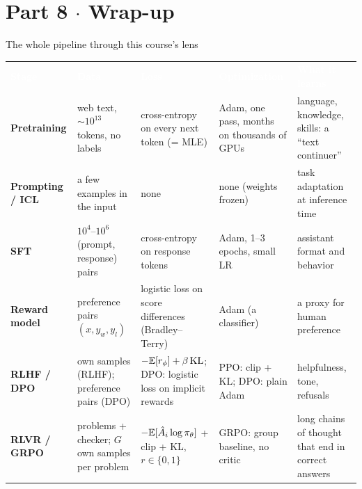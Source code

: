 \section{Part 8 $\cdot$ Wrap-up}

\begin{frame}{The whole pipeline through this course's lens}
\centering
\scriptsize
\renewcommand{\arraystretch}{1.35}\setlength{\tabcolsep}{4pt}
\begin{tabular}{@{}p{1.75cm}p{2.9cm}p{3.1cm}p{2.3cm}p{2.9cm}@{}}
\cellcolor{uvanavy}\textcolor{white}{\textbf{Stage}} &
\cellcolor{uvanavy}\textcolor{white}{\textbf{Data}} &
\cellcolor{uvanavy}\textcolor{white}{\textbf{Loss}} &
\cellcolor{uvanavy}\textcolor{white}{\textbf{Optimization}} &
\cellcolor{uvanavy}\textcolor{white}{\textbf{What it learns}}\\
\textbf{Pretraining} & \cellcolor{dataC}web text, $\sim 10^{13}$ tokens, no labels & \cellcolor{lossC}cross-entropy on every next token (= MLE) & \cellcolor{optC}Adam, one pass, months on thousands of GPUs & \cellcolor{learnC}language, knowledge, skills: a ``text continuer''\\
\textbf{Prompting / ICL} & \cellcolor{dataC}a few examples in the input & \cellcolor{lossC}none & \cellcolor{optC}none (weights frozen) & \cellcolor{learnC}task adaptation at inference time\\
\textbf{SFT} & \cellcolor{dataC}$10^4$--$10^6$ (prompt, response) pairs & \cellcolor{lossC}cross-entropy on response tokens & \cellcolor{optC}Adam, 1--3 epochs, small LR & \cellcolor{learnC}assistant format and behavior\\
\textbf{Reward model} & \cellcolor{dataC}preference pairs $(x,y_w,y_l)$ & \cellcolor{lossC}logistic loss on score differences (Bradley--Terry) & \cellcolor{optC}Adam (a classifier) & \cellcolor{learnC}a proxy for human preference\\
\textbf{RLHF / DPO} & \cellcolor{dataC}own samples (RLHF); preference pairs (DPO) & \cellcolor{lossC}$-\mathbb{E}[r_\phi] + \beta\,\mathrm{KL}$; DPO: logistic loss on implicit rewards & \cellcolor{optC}PPO: clip + KL; DPO: plain Adam & \cellcolor{learnC}helpfulness, tone, refusals\\
\textbf{RLVR / GRPO} & \cellcolor{dataC}problems + checker; $G$ own samples per problem & \cellcolor{lossC}$-\mathbb{E}[\hat A_i \log \pi_\theta]$ + clip + KL, $r\in\{0,1\}$ & \cellcolor{optC}GRPO: group baseline, no critic & \cellcolor{learnC}long chains of thought that end in correct answers\\
\end{tabular}
\end{frame}

